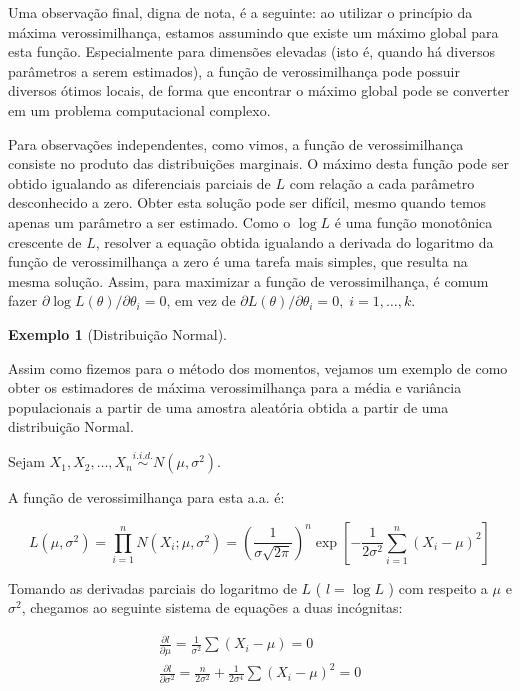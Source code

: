 \documentclass[
]{book}
\theoremstyle{definition}
\theoremstyle{definition}
\newtheorem{example}{Exemplo}[chapter]
\theoremstyle{definition}
\theoremstyle{remark}
\begin{document}
Uma observação final, digna de nota, é a seguinte: ao utilizar o princípio da máxima verossimilhança, estamos assumindo que existe um máximo global para esta função. Especialmente para dimensões elevadas (isto é, quando há diversos parâmetros a serem estimados), a função de verossimilhança pode possuir diversos ótimos locais, de forma que encontrar o máximo global pode se converter em um problema computacional complexo.

Para observações independentes, como vimos, a função de verossimilhança consiste no produto das distribuições marginais. O máximo desta função pode ser obtido igualando as diferenciais parciais de \(L\) com relação a cada parâmetro desconhecido a zero. Obter esta solução pode ser difícil, mesmo quando temos apenas um parâmetro a ser estimado. Como o \(\log L\) é uma função monotônica crescente de \(L\), resolver a equação obtida igualando a derivada do logaritmo da função de verossimilhança a zero é uma tarefa mais simples, que resulta na mesma solução. Assim, para maximizar a função de verossimilhança, é comum fazer \(\partial\log L(\theta)/\partial\theta_i = 0\), em vez de \(\partial L(\theta)/\partial \theta_i = 0, \; i = 1, \ldots, k\).

\begin{example}[Distribuição Normal]
\protect\hypertarget{exm:unnamed-chunk-12}{}{\label{exm:unnamed-chunk-12} {} }
\end{example}

Assim como fizemos para o método dos momentos, vejamos um exemplo de como obter os estimadores de máxima verossimilhança para a média e variância populacionais a partir de uma amostra aleatória obtida a partir de uma distribuição Normal.

Sejam \(X_1, X_2, \ldots, X_n \overset{i.i.d.}{\sim} N(\mu, \sigma^2)\).

A função de verossimilhança para esta a.a. é:

\[L(\mu, \sigma^2) = \prod_{i = 1}^{n} N(X_i; \mu, \sigma^2) 
                   = \left( \frac{1}{\sigma\sqrt{2\pi}} \right)^n
                     \exp\left[ -\frac{1}{2\sigma^2} \sum_{i =1}^{n} (X_i - \mu)^2\right]\]

Tomando as derivadas parciais do logaritmo de \(L\) ( \(l = \log L\) ) com respeito a \(\mu\) e \(\sigma^2\), chegamos ao seguinte sistema de equações a duas incógnitas:

\begin{align*}
  \frac{\partial l}{\partial \mu} = \frac{1}{\sigma^2} \sum(X_i - \mu) =0\\
  \frac{\partial l}{\partial \sigma^2} = \frac{n}{2\sigma^2} + \frac{1}{2\sigma^4} \sum(X_i - \mu)^2 =0
\end{align*}
\end{document}
